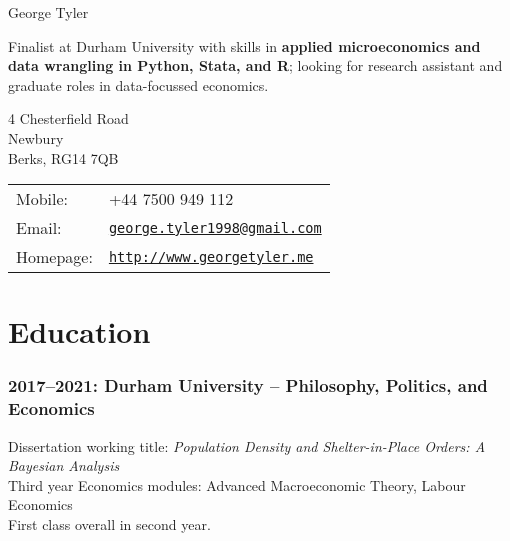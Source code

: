 \documentclass[a4]{article}
\def\name{George Tyler}
\renewenvironment{itemize}{
  \begin{list}{}{
    \setlength{\leftmargin}{1.5em}
  }
}{
  \end{list}
}
\begin{document}
{\huge \name}


\vspace{0.25in}

Finalist at Durham University with skills in \textbf{applied microeconomics and data wrangling in Python, Stata, and R}; looking for research assistant and graduate roles in data-focussed economics.

\vspace{0.25in}

\begin{minipage}{0.45\linewidth}
  4 Chesterfield Road \\
  Newbury \\
  Berks, RG14 7QB
\end{minipage}
\begin{minipage}{0.45\linewidth}
  \begin{tabular}{ll}
    Mobile: & +44 7500 949 112 \\
    Email: & \href{mailto:george.tyler1998@gmail.com}{\tt george.tyler1998@gmail.com} \\
    Homepage: & \href{http://www.georgetyler.me}{\tt http://www.georgetyler.me} \\
  \end{tabular}
\end{minipage}





\section*{Education}

\subsubsection*{2017--2021: Durham University -- Philosophy, Politics, and Economics}
Dissertation working title: \textit{Population Density and Shelter-in-Place Orders: A Bayesian Analysis} \\
Third year Economics modules: Advanced Macroeconomic Theory, Labour Economics \\
First class overall in second year.%
\end{document}
